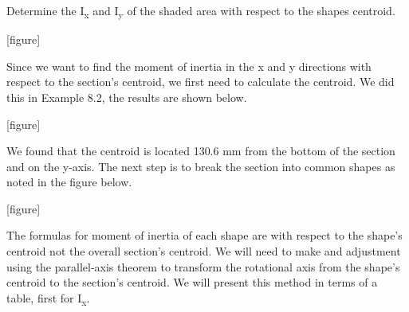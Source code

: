 \documentclass[
  letterpaper,
  DIV=11,
  numbers=noendperiod]{scrreprt}
\begin{document}
\begin{tcolorbox}[enhanced jigsaw, breakable, opacityback=0, toptitle=1mm, left=2mm, colback=white, opacitybacktitle=0.6, colframe=quarto-callout-tip-color-frame, titlerule=0mm, arc=.35mm, leftrule=.75mm, bottomtitle=1mm, colbacktitle=quarto-callout-tip-color!10!white, rightrule=.15mm, title={Example 8.5}, bottomrule=.15mm, toprule=.15mm, coltitle=black]

Determine the I\textsubscript{x} and I\textsubscript{y} of the shaded
area with respect to the shapes centroid.

{[}figure{]}

\begin{tcolorbox}[enhanced jigsaw, breakable, opacityback=0, toptitle=1mm, left=2mm, colback=white, opacitybacktitle=0.6, colframe=quarto-callout-tip-color-frame, titlerule=0mm, arc=.35mm, leftrule=.75mm, bottomtitle=1mm, colbacktitle=quarto-callout-tip-color!10!white, rightrule=.15mm, title={Solution}, bottomrule=.15mm, toprule=.15mm, coltitle=black]

Since we want to find the moment of inertia in the x and y directions
with respect to the section's centroid, we first need to calculate the
centroid. We did this in Example 8.2, the results are shown below.

{[}figure{]}

We found that the centroid is located 130.6 mm from the bottom of the
section and on the y-axis. The next step is to break the section into
common shapes as noted in the figure below.

{[}figure{]}

The formulas for moment of inertia of each shape are with respect to the
shape's centroid not the overall section's centroid. We will need to
make and adjustment using the parallel-axis theorem to transform the
rotational axis from the shape's centroid to the section's centroid. We
will present this method in terms of a table, first for
I\textsubscript{x}.


\end{tcolorbox}
\end{tcolorbox}
\end{document}
